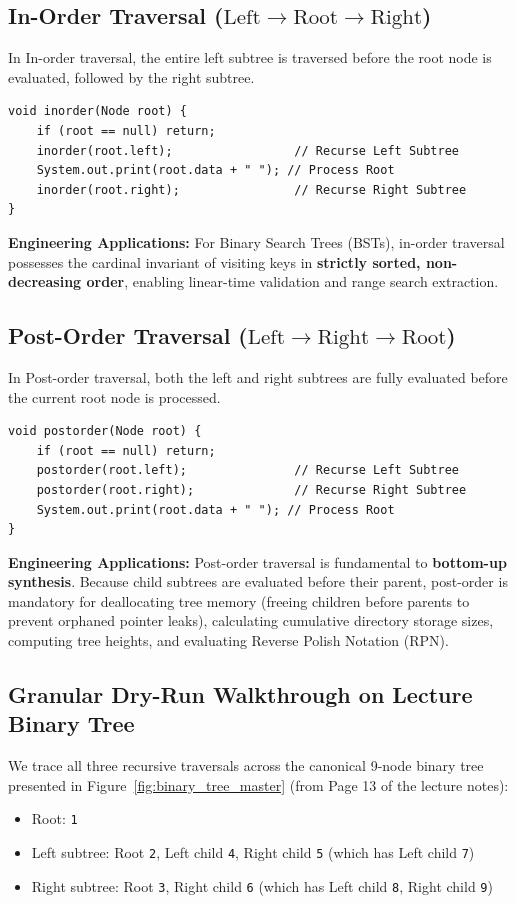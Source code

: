 \documentclass[10pt,journal,compsoc,onecolumn]{IEEEtran}
\begin{document}
\subsection{In-Order Traversal ($\text{Left} \to \text{Root} \to \text{Right}$)}

In In-order traversal, the entire left subtree is traversed before the root node is evaluated, followed by the right subtree.
\begin{verbatim}
void inorder(Node root) {
    if (root == null) return;
    inorder(root.left);                 // Recurse Left Subtree
    System.out.print(root.data + " "); // Process Root
    inorder(root.right);                // Recurse Right Subtree
}
\end{verbatim}
\textbf{Engineering Applications:} For Binary Search Trees (BSTs), in-order traversal possesses the cardinal invariant of visiting keys in \textbf{strictly sorted, non-decreasing order}, enabling linear-time validation and range search extraction.

\subsection{Post-Order Traversal ($\text{Left} \to \text{Right} \to \text{Root}$)}

In Post-order traversal, both the left and right subtrees are fully evaluated before the current root node is processed.
\begin{verbatim}
void postorder(Node root) {
    if (root == null) return;
    postorder(root.left);               // Recurse Left Subtree
    postorder(root.right);              // Recurse Right Subtree
    System.out.print(root.data + " "); // Process Root
}
\end{verbatim}
\textbf{Engineering Applications:} Post-order traversal is fundamental to \textbf{bottom-up synthesis}. Because child subtrees are evaluated before their parent, post-order is mandatory for deallocating tree memory (freeing children before parents to prevent orphaned pointer leaks), calculating cumulative directory storage sizes, computing tree heights, and evaluating Reverse Polish Notation (RPN).

\subsection{Granular Dry-Run Walkthrough on Lecture Binary Tree}

We trace all three recursive traversals across the canonical 9-node binary tree presented in Figure~\ref{fig:binary_tree_master} (from Page 13 of the lecture notes):
\begin{itemize}
    \item Root: \texttt{1}
    \item Left subtree: Root \texttt{2}, Left child \texttt{4}, Right child \texttt{5} (which has Left child \texttt{7})
    \item Right subtree: Root \texttt{3}, Right child \texttt{6} (which has Left child \texttt{8}, Right child \texttt{9})
\end{itemize}
\end{document}

